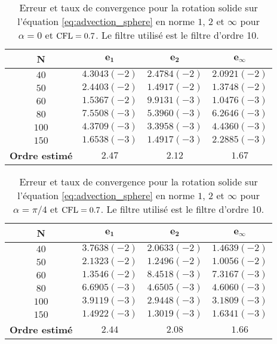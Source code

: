 \begin{table}[htbp]
\begin{center}
\begin{tabular}{|c||c|c|c|}
\hline
\textbf{N}  & $\mathbf{e_1}$ & $\mathbf{e_2}$ & $\mathbf{e_{\infty}}$\\
\hline
\hline
$40$  & $4.3043 (-2)$ & $2.4784 (-2)$ & $2.0921 (-2)$ \\
$50$  & $2.4403 (-2)$ & $1.4917 (-2)$ & $1.3748 (-2)$ \\
$60$  & $1.5367 (-2)$ & $9.9131 (-3)$ & $1.0476 (-3)$ \\
$80$  & $7.5508 (-3)$ & $5.3960 (-3)$ & $6.2646 (-3)$ \\
$100$  & $4.3709 (-3)$ & $3.3958 (-3)$ & $4.4360 (-3)$ \\
$150$  & $1.6538 (-3)$ & $1.4917 (-3)$ & $2.2885 (-3)$ \\
\hline 
\hline
\textbf{Ordre estimé}& $2.47$ & $2.12$ & $1.67$\\
\hline
\end{tabular}
\end{center}
\caption{Erreur et taux de convergence pour la rotation solide sur l'équation \eqref{eq:advection_sphere} en norme $1$, $2$ et $\infty$ pour $\alpha = 0$ et $\text{CFL} = 0.7$. Le filtre utilisé est le filtre d'ordre 10.}
\label{tab:rate1_bump}
\end{table} 

\begin{table}[htbp]
\begin{center}
\begin{tabular}{|c||c|c|c|}
\hline
\textbf{N}  & $\mathbf{e_1}$ & $\mathbf{e_2}$ & $\mathbf{e_{\infty}}$\\
\hline
\hline
$40$  & $3.7638 (-2)$ & $2.0633 (-2)$ & $1.4639 (-2)$ \\
$50$  & $2.1323 (-2)$ & $1.2496 (-2)$ & $1.0056 (-2)$ \\
$60$  & $1.3546 (-2)$ & $8.4518 (-3)$ & $7.3167 (-3)$ \\
$80$  & $6.6905 (-3)$ & $4.6505 (-3)$ & $4.6060 (-3)$ \\
$100$  & $3.9119 (-3)$ & $2.9448 (-3)$ & $3.1809 (-3)$ \\
$150$  & $1.4922 (-3)$ & $1.3019 (-3)$ & $1.6341 (-3)$ \\
\hline 
\hline
\textbf{Ordre estimé}& $2.44$ & $2.08$ & $1.66$\\
\hline
\end{tabular}
\end{center}
\caption{Erreur et taux de convergence pour la rotation solide sur l'équation \eqref{eq:advection_sphere} en norme $1$, $2$ et $\infty$ pour $\alpha = \pi / 4$ et $\text{CFL} = 0.7$. Le filtre utilisé est le filtre d'ordre 10.}
\label{tab:rate2_bump}
\end{table} 


